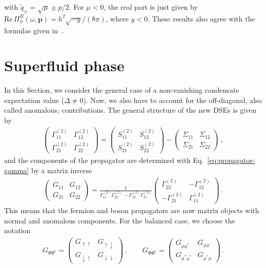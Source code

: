 with $\tilde{q}_{\pm} = \sqrt{\mu} \pm p/2$. For $\mu<0$, the real part is just given by $\text{Re}\, \Pi^R_{\phi}(\omega,\bm{p})=h^2\sqrt{-y}/(8\pi)$, where $y<0$. These results also agree with the formulas given in~\cite{Punk2010}.


\clearpage

\section{Superfluid phase}
\label{section:superfluid-phase}

In this Section, we consider the general case of a non-vanishing condensate expectation value ($\Delta\neq 0$). Now, we also have to account for the off-diagonal, also called anomalous, contributions. The general structure of the new DSEs is given by
%
\begin{align}
	\label{eq:matrix-DSE-structure}
	\begin{pmatrix}
		\Gamma^{(2)}_{11} & \Gamma^{(2)}_{12} \\
		\Gamma^{(2)}_{21} & \Gamma^{(2)}_{22}
	\end{pmatrix}
	=
	\begin{pmatrix}
		S^{(2)}_{11} & S^{(2)}_{12} \\
		S^{(2)}_{21} & S^{(2)}_{22}
	\end{pmatrix}
	-
	\begin{pmatrix}
		\Sigma_{11} & \Sigma_{12} \\
		\Sigma_{21} & \Sigma_{22}
	\end{pmatrix} \,,
\end{align}
%
and the components of the propagator are determined with Eq.~\eqref{eq:propagator-gamma} by a matrix inverse
%
\begin{align}
	\label{eq:matrix-propagator-inverse}
	\begin{pmatrix}
		G_{11} & G_{12} \\
		G_{21} & G_{22}
	\end{pmatrix}
	= \frac{1}{\Gamma^{(2)}_{11}\Gamma^{(2)}_{22}
		-\Gamma^{(2)}_{12}\Gamma^{(2)}_{21}}
	\begin{pmatrix}
		\Gamma^{(2)}_{22} & -\Gamma^{(2)}_{12} \\
		-\Gamma^{(2)}_{21} & \Gamma^{(2)}_{11}
	\end{pmatrix} \,.
\end{align}
%
This means that the fermion and boson propagators are now matrix objects with normal and anomalous components. For the balanced case, we choose the notation
%
\begin{align}
	\label{eq:matrix-propagators-components}
	G_{\Psi\Psi^{\dagger}} =
	\begin{pmatrix}
		G_{\uparrow\uparrow} & G_{\uparrow\downarrow} \\
		G_{\downarrow\uparrow} & G_{\downarrow\downarrow}
	\end{pmatrix} \,, \qquad
	G_{\Phi\Phi^{\dagger}} =
	\begin{pmatrix}
		G_{\phi\phi^*} & G_{\phi\phi} \\
		G_{\phi^*\phi^*} & G_{\phi^*\phi}
	\end{pmatrix} \,.
\end{align}
